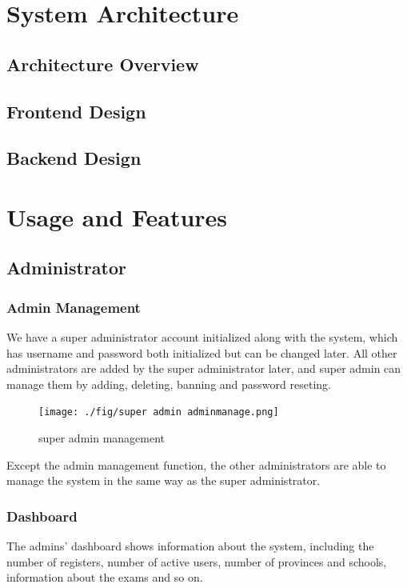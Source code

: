 \documentclass[12pt]{article}
\begin{document}
\section{System Architecture}
\subsection{Architecture Overview}
\subsection{Frontend Design}
\subsection{Backend Design}

\section{Usage and Features}
\subsection{Administrator}
\subsubsection{Admin Management}
We have a super administrator account initialized along with the system, which has username and password both initialized but can be changed later. All other administrators are added by
the super administrator later, and super admin can manage them by adding, deleting, banning and password reseting.
\begin{figure}[htbp] %
    \centering %
    \texttt{[image: ./fig/super admin adminmanage.png]} %
    \caption{super admin management} %
    \label{fig:example} %
\end{figure}
Except the admin management
function, the other administrators are able to manage the system in the same way as the super administrator.
\subsubsection{Dashboard}
The admins' dashboard shows information about the system, including the number of registers, number of active users, number of provinces and schools,
information about the exams and so on.
\end{document}
